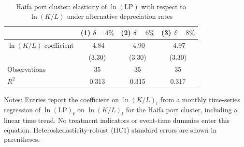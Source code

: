 \begin{table}[t]
  \centering
  \caption{Haifa port cluster: elasticity of $\ln(\mathrm{LP})$ with respect to $\ln(K/L)$ under alternative depreciation rates}
  \label{tab:haifa_cluster_elasticity}
  \begin{threeparttable}
    \small
    \setlength{\tabcolsep}{8pt}
    \renewcommand{\arraystretch}{1.1}
    \begin{tabular}{l*{3}{c}}
      \toprule
      & (1) $\delta=4\%$ & (2) $\delta=6\%$ & (3) $\delta=8\%$ \\
      \midrule
      $\ln(K/L)$ coefficient & -4.84 & -4.90 & -4.97 \\
                             & (3.30) & (3.30) & (3.30) \\
      Observations           & 35 & 35 & 35 \\
      $R^2$                  & 0.313 & 0.315 & 0.317 \\
      \bottomrule
    \end{tabular}
    \begin{tablenotes}[flushleft]
      \footnotesize
      \item Notes: Entries report the coefficient on $\ln(K/L)_t$ from a monthly time-series regression of $\ln(\mathrm{LP})_t$
      on $\ln(K/L)_t$ for the Haifa port cluster, including a linear time trend.
      No treatment indicators or event-time dummies enter this equation.
      Heteroskedasticity-robust (HC1) standard errors are shown in parentheses.
    \end{tablenotes}
  \end{threeparttable}
\end{table}